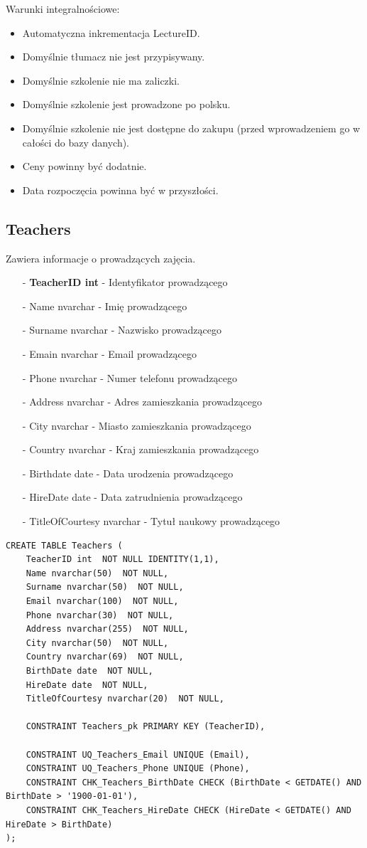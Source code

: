 \documentclass[11pt,a4paper]{article}
\begin{document}
Warunki integralnościowe:
\begin{itemize}
    \item Automatyczna inkrementacja LectureID.
    \item Domyślnie tłumacz nie jest przypisywany.
    \item Domyślnie szkolenie nie ma zaliczki.
    \item Domyślnie szkolenie jest prowadzone po polsku.
    \item Domyślnie szkolenie nie jest dostępne do zakupu (przed    wprowadzeniem go w całości do bazy danych).
    \item Ceny powinny być dodatnie.
    \item Data rozpoczęcia powinna być w przyszłości.
\end{itemize}

\subsection{Teachers}
Zawiera informacje o prowadzących zajęcia.

\begin{itemize}
    \item[-] \textbf{TeacherID int} - Identyfikator prowadzącego
    \item[-] Name nvarchar - Imię prowadzącego
    \item[-] Surname nvarchar - Nazwisko prowadzącego
    \item[-] Emain nvarchar - Email prowadzącego
    \item[-] Phone nvarchar - Numer telefonu prowadzącego
    \item[-] Address nvarchar - Adres zamieszkania prowadzącego
    \item[-] City nvarchar - Miasto zamieszkania prowadzącego
    \item[-] Country nvarchar - Kraj zamieszkania prowadzącego
    \item[-] Birthdate date - Data urodzenia prowadzącego
    \item[-] HireDate date - Data zatrudnienia prowadzącego
    \item[-] TitleOfCourtesy nvarchar - Tytuł naukowy prowadzącego
\end{itemize}

\begin{Verbatim}[breaklines=true]
CREATE TABLE Teachers (
    TeacherID int  NOT NULL IDENTITY(1,1),
    Name nvarchar(50)  NOT NULL,
    Surname nvarchar(50)  NOT NULL,
    Email nvarchar(100)  NOT NULL,
    Phone nvarchar(30)  NOT NULL,
    Address nvarchar(255)  NOT NULL,
    City nvarchar(50)  NOT NULL,
    Country nvarchar(69)  NOT NULL,
    BirthDate date  NOT NULL,
    HireDate date  NOT NULL,
    TitleOfCourtesy nvarchar(20)  NOT NULL,

    CONSTRAINT Teachers_pk PRIMARY KEY (TeacherID),

    CONSTRAINT UQ_Teachers_Email UNIQUE (Email),
    CONSTRAINT UQ_Teachers_Phone UNIQUE (Phone),
    CONSTRAINT CHK_Teachers_BirthDate CHECK (BirthDate < GETDATE() AND BirthDate > '1900-01-01'),
    CONSTRAINT CHK_Teachers_HireDate CHECK (HireDate < GETDATE() AND HireDate > BirthDate)
);
\end{Verbatim}
\end{document}
